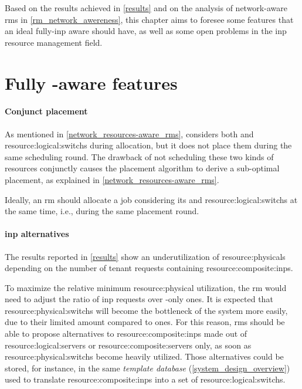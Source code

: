 Based on the results achieved in \autoref{results} and on the analysis of network-aware \glspl{rm} in \autoref{rm_network_awereness}, this chapter aims to foresee some features that an ideal fully-\gls{inp} aware  should have, as well as some open problems in the \gls{inp} resource management field.

\section{Fully \texorpdfstring{}{INP}-aware \texorpdfstring{}{RM} features}

\paragraph{Conjunct placement}
As mentioned in \autoref{network_resources-aware_rms}, \cite{ontackling} considers both  and \glspl{resource:logical:switch} during allocation, but it does not place them during the same scheduling round.
The drawback of not scheduling these two kinds of resources conjunctly causes the placement algorithm to derive a sub-optimal placement, as explained in \autoref{network_resources-aware_rms}.

Ideally, an \gls{rm} should allocate a job considering its  and \glspl{resource:logical:switch} at the same time, i.e., during the same placement round.

\paragraph{\gls{inp} alternatives}
The results reported in \autoref{results} show an underutilization of \glspl{resource:physical} depending on the number of tenant requests containing \glspl{resource:composite:inp}.

To maximize the relative minimum \gls{resource:physical} utilization, the \gls{rm} would need to adjust the ratio of \gls{inp} requests over -only ones.
It is expected that \glspl{resource:physical:switch} will become the bottleneck of the system more easily, due to their limited amount compared to  ones.
For this reason, \glspl{rm} should be able to propose alternatives to \glspl{resource:composite:inp} made out of \glspl{resource:logical:server} or \glspl{resource:composite:server} only, as soon as \glspl{resource:physical:switch} become heavily utilized.
Those alternatives could be stored, for instance, in the same \textit{template database} (\autoref{system_design_overview}) used to translate \glspl{resource:composite:inp} into a set of \glspl{resource:logical:switch}.

